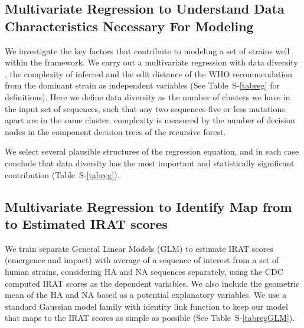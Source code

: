 {\subsection*{Multivariate Regression to Understand Data Characteristics Necessary For \enet Modeling}

We investigate the key factors that contribute to modeling a set of strains well within the \enet framework. We carry out a multivariate regression with data diversity , the complexity of inferred \enet and the edit distance of the WHO recommendation from the dominant strain as independent variables (See \SUPPLEMENTARY Table~S-\ref{tabreg} for definitions). Here we define data diversity as the number of clusters we have in the input set of sequences, such that any two sequences five or less mutations apart are in the same cluster. \enet complexity is measured by the number of decision nodes in the component decision trees of the recursive forest.

We select several plausible structures of the regression equation, and in each case conclude that  data diversity has the most important and statistically significant contribution (\SUPPLEMENTARY Table~S-\ref{tabreg}).

\subsection*{Multivariate Regression to Identify Map from \qdist to Estimated IRAT scores}
We train separate General Linear Models (GLM) to estimate IRAT scores (emergence and impact) with average \qdist of a sequence of interest from a set of human strains, considering HA and NA sequences separately, using the CDC computed IRAT scores as the dependent variables. We also  include the geometric mean of the HA and NA based  as a potential explanatory variables. We use a standard Gaussian model family with identity link function to keep our model that maps   to the IRAT scores as simple as possible (See \SUPPLEMENTARY Table~S-\ref{tabregGLM}).


 



}